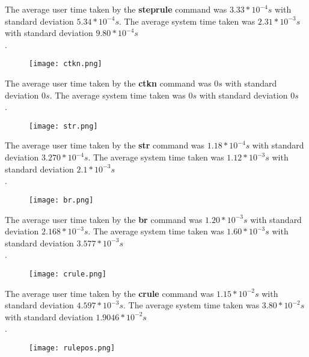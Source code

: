 \noindent

The average user time taken by the \textbf{steprule} command was $3.33*10^{-4} s$ with standard deviation $ 5.34*10^{-4}s$. The average system time taken was $2.31 * 10^{-3} s$ with standard deviation $9.80* 10^{-4} s$\\.


\begin{figure}[H] \centering
\texttt{[image: ctkn.png]}
\end{figure}

\noindent

The average user time taken by the \textbf{ctkn} command was $0 s$ with standard deviation $0 s$. The average system  time taken was $0 s$ with standard deviation $0 s$\\.


\begin{figure}[H] \centering
\texttt{[image: str.png]}
\end{figure}

\noindent

The average user time taken by the \textbf{str} command was $1.18 * 10^{-4} s$ with standard deviation $3.270 * 10^{-4} s$. The average system  time taken was $1.12 * 10^{-3} s$ with standard deviation $2.1 * 10^{-3} s$\\.


\begin{figure}[H] \centering
\texttt{[image: br.png]}
\end{figure}

\noindent

The average user time taken by the \textbf{br} command was $1.20 * 10^{-3} s$ with standard deviation $2.168 * 10^{-3} s$. The average system time taken was $1.60 * 10^{-3} s$ with standard deviation $3.577 * 10^{-3} s$\\.


\begin{figure}[H] \centering
\texttt{[image: crule.png]}
\end{figure}

\noindent

The average user time taken by the \textbf{crule} command was $1.15 * 10^{-2} s$ with standard deviation $4.597 * 10^{-3} s$. The average system  time taken was $3.80 * 10^{-2} s$ with standard deviation $1.9046 * 10^{-2} s$\\.

\begin{figure}[H] \centering
\texttt{[image: rulepos.png]}
\end{figure}

